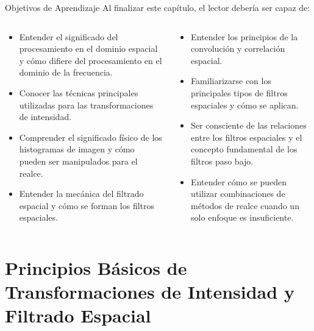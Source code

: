 \documentclass{beamer}
\begin{document}
\begin{frame}{Objetivos de Aprendizaje}
    Al finalizar este capítulo, el lector debería ser capaz de:
    \begin{columns}[T,onlytextwidth]
        \begin{column}{0.5\textwidth}
            \begin{itemize}
                \item Entender el significado del procesamiento en el dominio espacial y cómo difiere del procesamiento en el dominio de la frecuencia.
                \item Conocer las técnicas principales utilizadas para las transformaciones de intensidad.
                \item Comprender el significado físico de los histogramas de imagen y cómo pueden ser manipulados para el realce.
                \item Entender la mecánica del filtrado espacial y cómo se forman los filtros espaciales.
            \end{itemize}
        \end{column}
        \begin{column}{0.5\textwidth}
            \begin{itemize}
                \item Entender los principios de la convolución y correlación espacial.
                \item Familiarizarse con los principales tipos de filtros espaciales y cómo se aplican.
                \item Ser consciente de las relaciones entre los filtros espaciales y el concepto fundamental de los filtros paso bajo.
                \item Entender cómo se pueden utilizar combinaciones de métodos de realce cuando un solo enfoque es insuficiente.
            \end{itemize}
        \end{column}
    \end{columns}
\end{frame}

\section{Principios Básicos de Transformaciones de Intensidad y Filtrado Espacial}
\end{document}
